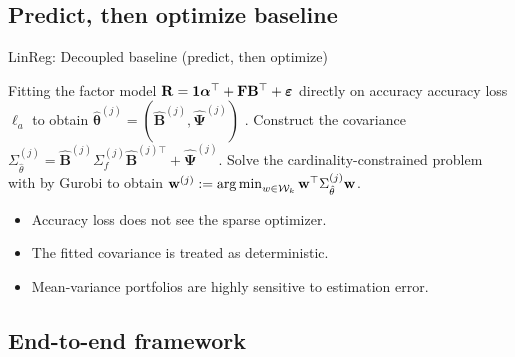 \documentclass[10pt,aspectratio=169]{beamer}
\newcommand{\Nassets}{N}
\newcommand{\Kcard}{k}
\newcommand{\Wset}{\mathcal{W}}
\newcommand{\Param}{\theta}
\newcommand{\SigmaMat}{\Sigma}
\begin{document}


\subsection{Predict, then optimize baseline}

\begin{frame}{LinReg: Decoupled baseline (predict, then optimize)}
  \small 
  \begin{algorithm}[H]
    \DontPrintSemicolon
    Fitting the factor model $\mathbf{R} = \mathbf{1} \boldsymbol{\alpha}^\top + \mathbf{F}\mathbf{B}^\top + \boldsymbol{\varepsilon}$ directly on accuracy accuracy loss $\ell_a$ to obtain $\hat{\boldsymbol{\Param}}^{(j)}= (\hat{\mathbf{B}}^{(j)}, \hat{\boldsymbol{\Psi}}^{(j)})$    .\;
    Construct the covariance $\SigmaMat_{\hat{\Param}}^{(j)} = \hat{\mathbf{B}}^{(j)} \SigmaMat_f^{(j)} \hat{\mathbf{B}}^{(j)\top} + \hat{\boldsymbol{\Psi}}^{(j)}$.\;
    Solve the cardinality-constrained problem with by Gurobi to obtain $\mathbf{w}^{(j)}:=\argmin_{w\in\Wset_\Kcard} \mathbf{w}^\top \SigmaMat_{\hat{\Param}}^{(j)} \mathbf{w}$.\;
  \end{algorithm}

  \begin{itemize}
    \item Accuracy loss does not see the sparse optimizer.
    \item The fitted covariance is treated as deterministic.
    \item Mean-variance portfolios are highly sensitive to estimation error.
  \end{itemize}
\end{frame}

\subsection{End-to-end framework}
\end{document}
